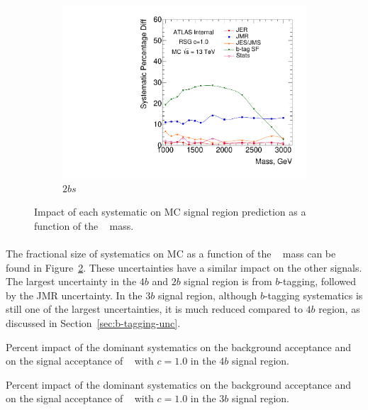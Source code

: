 \begin{figure}[htb!]
\begin{subfigure}[b]{0.45\textwidth}
        \includegraphics[width=\textwidth,angle=-90]{figures/boosted/Syst_MC/TwoTag_split_RSG_syst.pdf}
        \caption{$2bs$}
        \label{fig:signal_syst_summary-2b}
    \end{subfigure}
  \caption{Impact of each systematic on MC signal region prediction as a function of the \Grav~ mass.}
  \label{fig:signal_syst_summary}
\end{figure}

\paragraph{}
The fractional size of systematics on MC as a function of the \Grav~ mass can be found in Figure~\ref{fig:signal_syst_summary}. 
These uncertainties have a similar impact on the other signals. 
The largest uncertainty in the $4b$ and $2b$ signal region is from $b$-tagging, followed by the JMR uncertainty.
In the $3b$ signal region, although $b$-tagging systematics is still one of the largest uncertainties, it is much reduced compared to $4b$ region, as discussed in Section~\ref{sec:b-tagging-unc}. 


\begin{table}[htb!]
\begin{center}
\caption{Percent impact of the dominant systematics on the background acceptance
         and on the signal acceptance of \Grav~ with $c=1.0$ in the $4b$ signal region.}

\label{tab:summary-systematics-4b}
\end{center}
\end{table}

\begin{table}[htb!]
\begin{center}
\caption{Percent impact of the dominant systematics on the background acceptance
         and on the signal acceptance of \Grav~ with $c=1.0$ in the $3b$ signal region.}

\label{tab:summary-systematics-3b}
\end{center}
\end{table}

